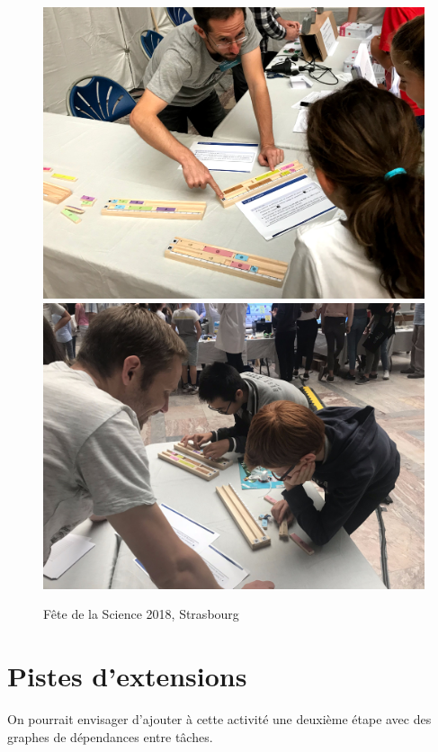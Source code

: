 \documentclass[a4paper]{article}
\begin{document}
\begin{figure}[h!]
\includegraphics[width=\textwidth]{photo_activite.jpg}\\
\includegraphics[width=\textwidth]{photo_activite2.jpg}

\caption{Fête de la Science 2018, Strasbourg}
\end{figure}

\section{Pistes d'extensions}

On pourrait envisager d'ajouter à cette activité une deuxième étape avec des graphes de dépendances entre tâches.







\clearpage

 

\end{document}
